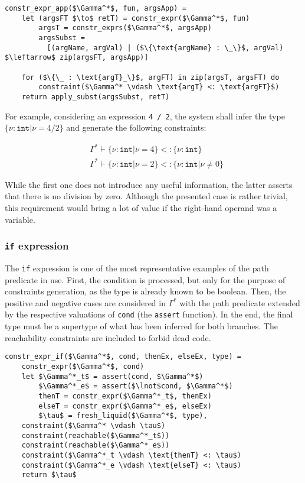 \begin{lstlisting}[language=pseudocode]
constr_expr_app($\Gamma^*$, fun, argsApp) =
    let (argsFT $\to$ retT) = constr_expr($\Gamma^*$, fun)
        argsT = constr_exprs($\Gamma^*$, argsApp)
        argsSubst =
          [(argName, argVal) | ($\{\text{argName} : \_\}$, argVal) $\leftarrow$ zip(argsFT, argsApp)]

    for ($\{\_ : \text{argT}_\}$, argFT) in zip(argsT, argsFT) do
        constraint($\Gamma^* \vdash \text{argT} <: \text{argFT}$)
    return apply_subst(argsSubst, retT)
\end{lstlisting}

For example, considering an expression \texttt{4 / 2}, the system shall infer
the type $\{\nu : \texttt{int} | \nu = 4 / 2\}$ and generate the following
constraints:

\begin{align*}
  & \Gamma^* \vdash \{\nu : \texttt{int} | \nu = 4\} <: \{\nu : \texttt{int}\}\\
  & \Gamma^* \vdash \{\nu : \texttt{int} | \nu = 2\} <: \{\nu : \texttt{int} | \nu \neq 0\}
\end{align*}

While the first one does not introduce any useful information, the latter
asserts that there is no division by zero. Although the presented case is rather
trivial, this requirement would bring a lot of value if the right-hand operand
was a variable.

\subsubsection{\texttt{if} expression}

The \texttt{if} expression is one of the most representative examples of the
path predicate in use. First, the condition is processed, but only for the
purpose of constraints generation, as the type is already known to be boolean.
Then, the positive and negative cases are considered in $\Gamma^*$ with the path
predicate extended by the respective valuations of \texttt{cond} (the
\texttt{assert} function). In the end, the final type must be a supertype of
what has been inferred for both branches. The reachability constraints are
included to forbid dead code.

\begin{lstlisting}[language=pseudocode]
constr_expr_if($\Gamma^*$, cond, thenEx, elseEx, type) =
    constr_expr($\Gamma^*$, cond)
    let $\Gamma^*_t$ = assert(cond, $\Gamma^*$)
        $\Gamma^*_e$ = assert($\lnot$cond, $\Gamma^*$)
        thenT = constr_expr($\Gamma^*_t$, thenEx)
        elseT = constr_expr($\Gamma^*_e$, elseEx)
        $\tau$ = fresh_liquid($\Gamma^*$, type),
    constraint($\Gamma^* \vdash \tau$)
    constraint(reachable($\Gamma^*_t$))
    constraint(reachable($\Gamma^*_e$))
    constraint($\Gamma^*_t \vdash \text{thenT} <: \tau$)
    constraint($\Gamma^*_e \vdash \text{elseT} <: \tau$)
    return $\tau$
\end{lstlisting}

